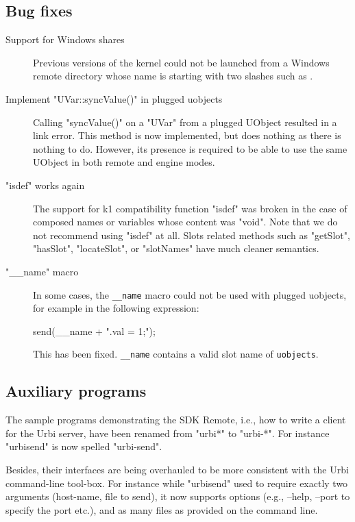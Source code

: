 \subsection{Bug fixes}
\begin{description}
\item[Support for Windows shares]

  Previous versions of the kernel could not be launched from a Windows
  remote directory whose name is starting with two slashes such as
  .

\item[Implement "UVar::syncValue()" in plugged uobjects]

Calling "syncValue()" on a "UVar" from a plugged UObject resulted in a
link error.  This method is now implemented, but does nothing as there
is nothing to do. However, its presence is required to be able to use
the same UObject in both remote and engine modes.

\item["isdef" works again]

The support for k1 compatibility function "isdef" was broken in the
case of composed names or variables whose content was "void". Note
that we do not recommend using "isdef" at all. Slots related methods
such as "getSlot", "hasSlot", "locateSlot", or "slotNames" have much
cleaner semantics.

\item["\_\_name" macro]

  In some cases, the \lstinline|__name| macro could not be used with
  plugged uobjects, for example in the following expression:

\begin{urbiuchecked}
send(__name + ".val = 1;");
\end{urbiuchecked}
  \noindent
  This has been fixed. \lstinline|__name| contains a valid slot name
  of \lstinline|uobjects|.
\end{description}

\subsection{Auxiliary programs}


The sample programs demonstrating the SDK Remote, i.e., how to write a
client for the Urbi server, have been renamed from "urbi*" to
"urbi-*".  For instance "urbisend" is now spelled "urbi-send".

Besides, their interfaces are being overhauled to be more consistent
with the Urbi command-line tool-box.  For instance while "urbisend"
used to require exactly two arguments (host-name, file to send), it
now supports options (e.g., --help, --port to specify the port etc.),
and as many files as provided on the command line.



